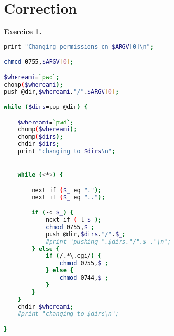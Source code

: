\section{Correction}

\textbf{Exercice 1.}

\begin{lstlisting}[language=bash]
print "Changing permissions on $ARGV[0]\n";

chmod 0755,$ARGV[0];

$whereami=`pwd`;
chomp($whereami);
push @dir,$whereami."/".$ARGV[0];

while ($dirs=pop @dir) {

	$whereami=`pwd`;
	chomp($whereami);
	chomp($dirs);
	chdir $dirs;
	print "changing to $dirs\n";


	while (<*>) {

		next if ($_ eq ".");
		next if ($_ eq "..");

		if (-d $_) {
			next if (-l $_);
			chmod 0755,$_;
			push @dir,$dirs."/".$_;
			#print "pushing ".$dirs."/".$_."\n";
		} else {
			if (/.*\.cgi/) {
				chmod 0755,$_;
			} else {
				chmod 0744,$_;
			}
		}
	}
	chdir $whereami;
	#print "changing to $dirs\n";

}
\end{lstlisting}
